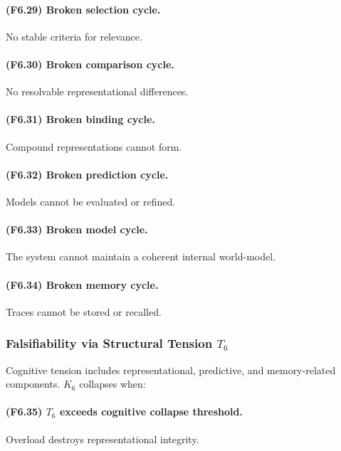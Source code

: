\paragraph{(F6.29) Broken selection cycle.}
No stable criteria for relevance.

\paragraph{(F6.30) Broken comparison cycle.}
No resolvable representational differences.

\paragraph{(F6.31) Broken binding cycle.}
Compound representations cannot form.

\paragraph{(F6.32) Broken prediction cycle.}
Models cannot be evaluated or refined.

\paragraph{(F6.33) Broken model cycle.}
The system cannot maintain a coherent internal world-model.

\paragraph{(F6.34) Broken memory cycle.}
Traces cannot be stored or recalled.



\subsubsection{Falsifiability via Structural Tension \texorpdfstring{$T_6$}{T_6}}

Cognitive tension includes representational, predictive, and memory-related
components. $K_6$ collapses when:

\paragraph{(F6.35) \texorpdfstring{$T_6$}{T_6} exceeds cognitive collapse threshold.}
Overload destroys representational integrity.

